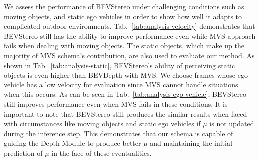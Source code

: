 \documentclass[letterpaper]{article} \usepackage[]{aaai23}  \usepackage{times}  \usepackage{helvet}  \usepackage{courier}  \usepackage[hyphens]{url}  \usepackage{graphicx} \urlstyle{rm} \def\UrlFont{\rm}  \usepackage{natbib}  \usepackage{caption} \frenchspacing  \setlength{\pdfpagewidth}{8.5in} \setlength{\pdfpageheight}{11in} \usepackage{algorithm}
\begin{document}
We assess the performance of BEVStereo under challenging conditions such as moving objects, and static ego vehicles in order to show how well it adapts to complicated outdoor environments. Tab.~\ref{tab:analysis-velocity} demonstrates that BEVStereo still has the ability to improve performance even while MVS approach fails when dealing with moving objects. The static objects, which make up the majority of MVS schema's contribution, are also used to evaluate our method. As shown in Tab.~\ref{tab:analysis-static}, BEVStereo's ability of perceiving static objects is even higher than BEVDepth with MVS. We choose frames whose ego vehicle has a low velocity for evaluation since MVS cannot handle situations when this occurs. As can be seen in Tab.~\ref{tab:analysis-ego-vehicle}, BEVStereo still improves performance even when MVS fails in these conditions. It is important to note that BEVStereo still produces the similar results when faced with circumstances like moving objects and static ego vehicles if $\mu$ is not updated during the inference step. This demonstrates that our schema is capable of guiding the Depth Module to produce better $\mu$ and maintaining the initial prediction of $\mu$ in the face of these eventualities.
\end{document}
